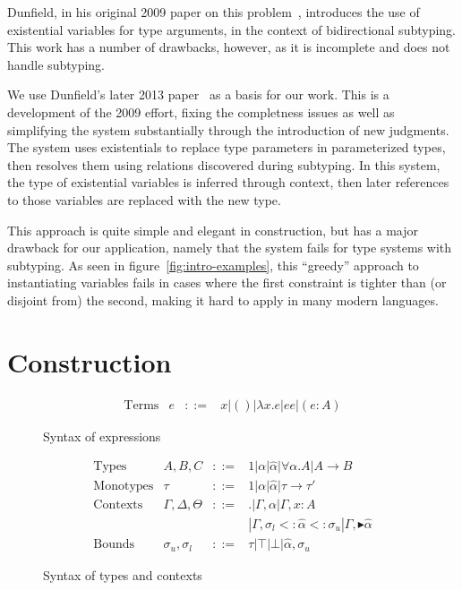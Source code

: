 \documentclass{sig-alternate}
\newcommand{\botbound}{\sigma_{l}}
\newcommand{\topbound}{\sigma_{u}}
\newcommand{\marker}[1]{{\scriptscriptstyle {\blacktriangleright #1}}}
\newcommand{\tst}{{\scriptstyle{<:}}}
\newcommand{\bound}[3]{#1 \tst #2 \tst #3}
\begin{document}
Dunfield, in his original 2009 paper on this problem~\cite{Dunfield09:polymorphism}, introduces the use of existential variables for type arguments, in the context of bidirectional subtyping. This work has a number of drawbacks, however, as it is incomplete and does not handle subtyping.

We use Dunfield's later 2013 paper~\cite{Dunfield:2013:CEB:2544174.2500582} as a basis for our work. This is a development of the 2009 effort, fixing the completness issues as well as simplifying the system substantially through the introduction of new judgments. The system uses existentials to replace type parameters in parameterized types, then resolves them using relations discovered during subtyping. In this system, the type of existential variables is inferred through context, then later references to those variables are replaced with the new type.

This approach is quite simple and elegant in construction, but has a major drawback for our application, namely that the system fails for type systems with subtyping. As seen in figure~\ref{fig:intro-examples}, this ``greedy'' approach to instantiating variables fails in cases where the first constraint is tighter than (or disjoint from) the second, making it hard to apply in many modern languages. 
\section{Construction}

\begin{figure}
\[
\begin{array}{lccl}
\text{Terms} & e &::=& x | () | \lambda x.e | e e | (e : A)
\end{array}
\]
\caption{Syntax of expressions}
\label{fig:term}
\end{figure}

\begin{figure}
\[
\begin{array}{lccl}
\text{Types} & A,B,C &::=& 1 | \alpha | \hat{\alpha} | \forall \alpha.A | A \rightarrow B\\
\text{Monotypes} & \tau &::=& 1 | \alpha | \hat{\alpha} | \tau \rightarrow \tau'\\
\text{Contexts} & \Gamma, \Delta, \Theta &::=& . | \Gamma, \alpha | \Gamma, x:A \\ &&& | \Gamma, \bound{\botbound}{\hat{\alpha}}{\topbound} | \Gamma, \marker{\hat{\alpha}}\\
\text{Bounds} & \topbound, \botbound &::=& \tau | \top | \bot | \hat{\alpha}, \topbound
\end{array}
\]
\caption{Syntax of types and contexts}
\label{fig:cons}
\end{figure}
%
 
\end{document}
